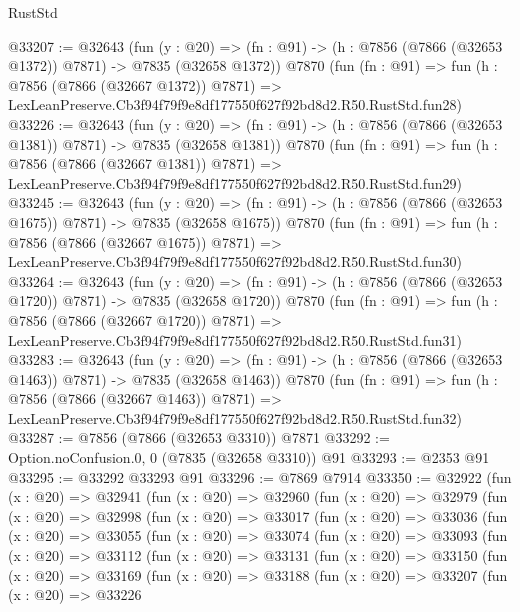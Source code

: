 \begin{lexlean}{RustStd}
\begin{coremodule}
@33207 := @32643
    (fun (y : @20) =>
    (fn : @91) -> (h : @7856 (@7866 (@32653 @1372)) @7871) -> @7835 (@32658 @1372))
    @7870
    (fun (fn : @91) =>
    fun (h : @7856 (@7866 (@32667 @1372)) @7871) =>
    LexLeanPreserve.Cb3f94f79f9e8df177550f627f92bd8d2.R50.RustStd.fun28)
@33226 := @32643
    (fun (y : @20) =>
    (fn : @91) -> (h : @7856 (@7866 (@32653 @1381)) @7871) -> @7835 (@32658 @1381))
    @7870
    (fun (fn : @91) =>
    fun (h : @7856 (@7866 (@32667 @1381)) @7871) =>
    LexLeanPreserve.Cb3f94f79f9e8df177550f627f92bd8d2.R50.RustStd.fun29)
@33245 := @32643
    (fun (y : @20) =>
    (fn : @91) -> (h : @7856 (@7866 (@32653 @1675)) @7871) -> @7835 (@32658 @1675))
    @7870
    (fun (fn : @91) =>
    fun (h : @7856 (@7866 (@32667 @1675)) @7871) =>
    LexLeanPreserve.Cb3f94f79f9e8df177550f627f92bd8d2.R50.RustStd.fun30)
@33264 := @32643
    (fun (y : @20) =>
    (fn : @91) -> (h : @7856 (@7866 (@32653 @1720)) @7871) -> @7835 (@32658 @1720))
    @7870
    (fun (fn : @91) =>
    fun (h : @7856 (@7866 (@32667 @1720)) @7871) =>
    LexLeanPreserve.Cb3f94f79f9e8df177550f627f92bd8d2.R50.RustStd.fun31)
@33283 := @32643
    (fun (y : @20) =>
    (fn : @91) -> (h : @7856 (@7866 (@32653 @1463)) @7871) -> @7835 (@32658 @1463))
    @7870
    (fun (fn : @91) =>
    fun (h : @7856 (@7866 (@32667 @1463)) @7871) =>
    LexLeanPreserve.Cb3f94f79f9e8df177550f627f92bd8d2.R50.RustStd.fun32)
@33287 := @7856 (@7866 (@32653 @3310)) @7871
@33292 := Option.noConfusion.{0, 0} (@7835 (@32658 @3310)) @91
@33293 := @2353 @91
@33295 := @33292 @33293 @91
@33296 := @7869 @7914
@33350 := @32922
    (fun (x : @20) =>
    @32941
      (fun (x : @20) =>
      @32960
        (fun (x : @20) =>
        @32979
          (fun (x : @20) =>
          @32998
            (fun (x : @20) =>
            @33017
              (fun (x : @20) =>
              @33036
                (fun (x : @20) =>
                @33055
                  (fun (x : @20) =>
                  @33074
                    (fun (x : @20) =>
                    @33093
                      (fun (x : @20) =>
                      @33112
                        (fun (x : @20) =>
                        @33131
                          (fun (x : @20) =>
                          @33150
                            (fun (x : @20) =>
                            @33169
                              (fun (x : @20) =>
                              @33188
                                (fun (x : @20) =>
                                @33207
                                  (fun (x : @20) =>
                                  @33226

\end{coremodule}
\end{lexlean}
